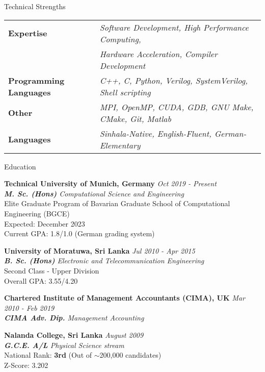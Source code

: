 \documentclass[
	11pt, %
]{./../assets/resume} %
\begin{document}

\begin{rSection}{Technical Strengths}
	\def\arraystretch{1.3}
	\begin{tabular}{ll}
		\textbf{Expertise} & \emph{Software Development, High Performance Computing, }\\
                           & \emph{Hardware Acceleration, Compiler Development} \\
		\textbf{Programming Languages} & \emph{C++, C, Python, Verilog, SystemVerilog, Shell scripting} \\
		\textbf{Other} & \emph{MPI, OpenMP, CUDA, GDB, GNU Make, CMake, Git, Matlab} \\ 
		\textbf{Languages} & \emph{Sinhala-Native, English-Fluent, German-Elementary} \\
	\end{tabular}

\end{rSection}


\begin{rSection}{Education}

	\textbf{Technical University of Munich, Germany} \hfill \textit{Oct 2019 - Present} \\ 
	\textit{\textbf{M. Sc. (Hons)} Computational Science and Engineering}  \\
    {\small Elite Graduate Program of Bavarian Graduate School of Computational Engineering (BGCE) \\
    Expected: December 2023 \\
    Current GPA: 1.8/1.0 (German grading system)}

	\textbf{University of Moratuwa, Sri Lanka} \hfill \textit{Jul 2010 - Apr 2015} \\ 
	\textit{\textbf{B. Sc. (Hons)} Electronic and Telecommunication Engineering} \\
	{\small Second Class - Upper Division \\
    Overall GPA: 3.55/4.20}

    \textbf{Chartered Institute of Management Accountants (CIMA), UK} \hfill \textit{Mar 2010 - Feb 2019} \\ 
    \textit{\textbf{CIMA Adv. Dip.} Management Accounting}

    \textbf{Nalanda College, Sri Lanka} \hfill
    \textit{August 2009}\\
    \textit{\textbf{G.C.E. A/L} Physical Science stream} \\
    {\small National Rank: \textbf{3rd} (Out of $\sim$200,000 candidates)} \\
    {\small Z-Score: 3.202}
	
\end{rSection}
\end{document}

